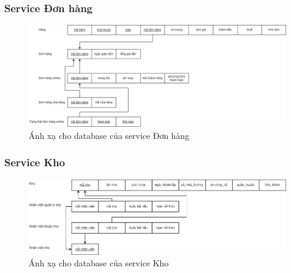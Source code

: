 \subsubsection{Service Đơn hàng}
\begin{figure}[!htp]
    \begin{center}
        \includegraphics[width=1\textwidth]{img/database/mapping/mapping-đơnhàng.png}
        \newline
        \caption{Ánh xạ cho database của service Đơn hàng}
    \end{center}
\end{figure}

\subsubsection{Service Kho}
\begin{figure}[!htp]
    \begin{center}
        \includegraphics[width=1\textwidth]{img/database/mapping/mapping-kho.png}
        \newline
        \caption{Ánh xạ cho database của service Kho}
    \end{center}
\end{figure}